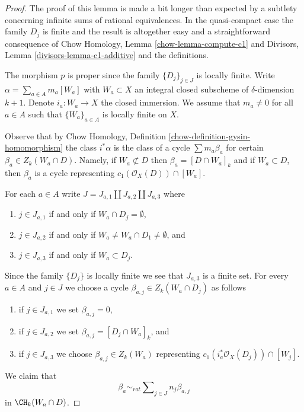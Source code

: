\begin{proof}
The proof of this lemma is made a bit longer than expected
by a subtlety concerning infinite sums of rational equivalences.
In the quasi-compact case the family $D_j$ is finite and the result
is altogether easy and a straightforward consequence of
Chow Homology, Lemma \ref{chow-lemma-compute-c1} and
Divisors, Lemma \ref{divisors-lemma-c1-additive} and the definitions.

\medskip\noindent
The morphism $p$ is proper since the family $\{D_j\}_{j \in J}$
is locally finite. Write $\alpha = \sum_{a \in A} m_a [W_a]$
with $W_a \subset X$ an integral closed subscheme of
$\delta$-dimension $k + 1$.
Denote $i_a : W_a \to X$ the closed immersion.
We assume that $m_a \not = 0$ for all $a \in A$ such that
$\{W_a\}_{a \in A}$ is locally finite on $X$.

\medskip\noindent
Observe that by
Chow Homology, Definition \ref{chow-definition-gysin-homomorphism}
the class $i^*\alpha$ is the class of a cycle
$\sum m_a\beta_a$ for certain $\beta_a \in Z_k(W_a \cap D)$.
Namely, if $W_a \not \subset D$ then $\beta_a = [D \cap W_a]_k$
and if $W_a \subset D$, then $\beta_a$ is a cycle
representing $c_1(\mathcal{O}_X(D)) \cap [W_a]$.

\medskip\noindent
For each $a \in A$ write $J = J_{a, 1} \amalg J_{a, 2} \amalg J_{a, 3}$
where
\begin{enumerate}
\item $j \in J_{a, 1}$ if and only if $W_a \cap D_j = \emptyset$,
\item $j \in J_{a, 2}$ if and only if
$W_a \not = W_a \cap D_1 \not = \emptyset$, and
\item $j \in J_{a, 3}$ if and only if $W_a \subset D_j$.
\end{enumerate}
Since the family $\{D_j\}$ is locally finite we see that
$J_{a, 3}$ is a finite set. For every $a \in A$ and $j \in J$
we choose a cycle $\beta_{a, j} \in Z_k(W_a \cap D_j)$ as follows
\begin{enumerate}
\item if $j \in J_{a, 1}$ we set $\beta_{a, j} = 0$,
\item if $j \in J_{a, 2}$ we set $\beta_{a, j} = [D_j \cap W_a]_k$, and
\item if $j \in J_{a, 3}$ we choose $\beta_{a, j} \in Z_k(W_a)$
representing $c_1(i_a^*\mathcal{O}_X(D_j)) \cap [W_j]$.
\end{enumerate}
We claim that
$$
\beta_a \sim_{rat}
\sum\nolimits_{j \in J} n_j \beta_{a, j}
$$
in $\CH_k(W_a \cap D)$.


\end{proof}
